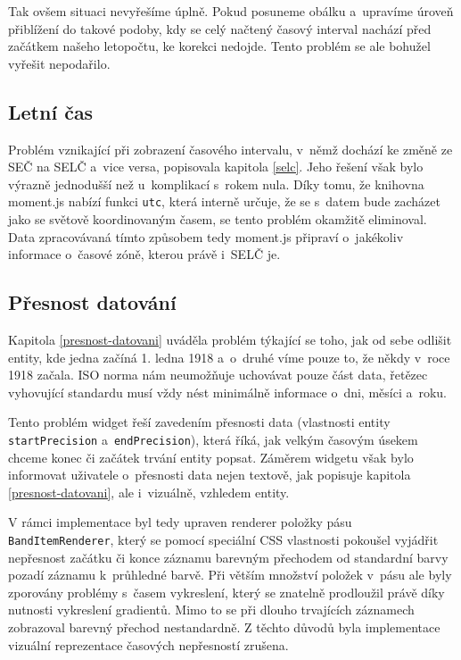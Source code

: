 				Tak ovšem situaci nevyřešíme úplně. Pokud posuneme obálku a~upravíme úroveň přiblížení do takové podoby, kdy se celý načtený časový interval nachází před začátkem našeho letopočtu, ke korekci nedojde. Tento problém se ale bohužel vyřešit nepodařilo.

			\subsection{Letní čas}
				Problém vznikající při zobrazení časového intervalu, v~němž dochází ke změně ze SEČ na SELČ a~vice versa, popisovala kapitola \ref{selc}. Jeho řešení však bylo výrazně jednodušší než u~komplikací s~rokem nula. Díky tomu, že knihovna {\sf moment.js} nabízí funkci {\tt utc}, která interně určuje, že se s~datem bude zacházet jako se světově koordinovaným časem, se tento problém okamžitě eliminoval. Data zpracovávaná tímto způsobem tedy {\sf moment.js} připraví o~jakékoliv informace o~časové zóně, kterou právě i~SELČ je.
			
			\subsection{Přesnost datování}
				Kapitola \ref{presnost-datovani} uváděla problém týkající se toho, jak od sebe odlišit entity, kde jedna začíná 1. ledna 1918 a~o~druhé víme pouze to, že někdy v~roce 1918 začala. ISO norma nám neumožňuje uchovávat pouze část data, řetězec vyhovující standardu musí vždy nést minimálně informace o~dni, měsíci a~roku.
				
				Tento problém widget řeší zavedením přesnosti data (vlastnosti entity {\tt start\-Precision} a~{\tt endPrecision}), která říká, jak velkým časovým úsekem chceme konec či začátek trvání entity popsat. Záměrem widgetu však bylo informovat uživatele o~přesnosti data nejen textově, jak popisuje kapitola \ref{presnost-datovani}, ale i~vizuálně, vzhledem entity.
				
				V rámci implementace byl tedy upraven renderer položky pásu {\tt BandItem\-Renderer}, který se pomocí speciální CSS vlastnosti pokoušel vyjádřit nepřesnost začátku či konce záznamu barevným přechodem od standardní barvy pozadí záznamu k~průhledné barvě. Při větším množství položek v~pásu ale byly zporovány problémy s~časem vykreslení, který se znatelně prodloužil právě díky nutnosti vykreslení gradientů. Mimo to se při dlouho trvajících záznamech zobrazoval barevný přechod nestandardně. Z těchto důvodů byla implementace vizuální reprezentace časových nepřesností zrušena.
			
